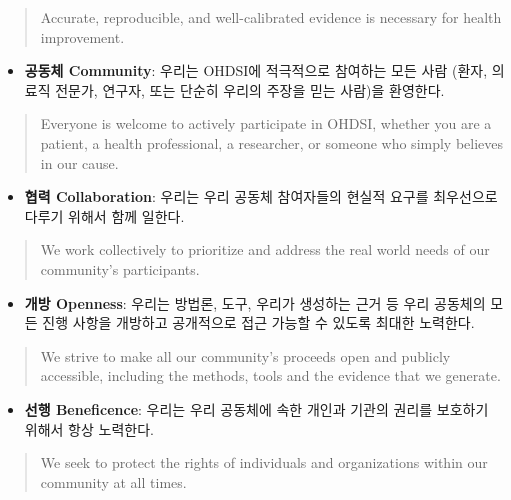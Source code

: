 \documentclass[10.5pt]{book}
\providecommand{\tightlist}{%
  \setlength{\itemsep}{0pt}\setlength{\parskip}{0pt}}
\theoremstyle{definition}
\theoremstyle{definition}
\theoremstyle{definition}
\theoremstyle{remark}
\begin{document}
\begin{quote}
Accurate, reproducible, and well-calibrated evidence is necessary for
health improvement.
\end{quote}

\begin{itemize}
\tightlist
\item
  \textbf{공동체 Community}: 우리는 OHDSI에 적극적으로 참여하는 모든
  사람 (환자, 의료직 전문가, 연구자, 또는 단순히 우리의 주장을 믿는
  사람)을 환영한다.
\end{itemize}

\begin{quote}
Everyone is welcome to actively participate in OHDSI, whether you are a
patient, a health professional, a researcher, or someone who simply
believes in our cause.
\end{quote}

\begin{itemize}
\tightlist
\item
  \textbf{협력 Collaboration}: 우리는 우리 공동체 참여자들의 현실적
  요구를 최우선으로 다루기 위해서 함께 일한다.
\end{itemize}

\begin{quote}
We work collectively to prioritize and address the real world needs of
our community's participants.
\end{quote}

\begin{itemize}
\tightlist
\item
  \textbf{개방 Openness}: 우리는 방법론, 도구, 우리가 생성하는 근거 등
  우리 공동체의 모든 진행 사항을 개방하고 공개적으로 접근 가능할 수
  있도록 최대한 노력한다.
\end{itemize}

\begin{quote}
We strive to make all our community's proceeds open and publicly
accessible, including the methods, tools and the evidence that we
generate.
\end{quote}

\begin{itemize}
\tightlist
\item
  \textbf{선행 Beneficence}: 우리는 우리 공동체에 속한 개인과 기관의
  권리를 보호하기 위해서 항상 노력한다.
\end{itemize}

\begin{quote}
We seek to protect the rights of individuals and organizations within
our community at all times.
\end{quote}
\end{document}
